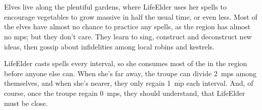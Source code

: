 \section{}
\label{plateauGardens}

Elves live along the plentiful gardens, where \gls{LifeElder} uses her spells to encourage vegetables to grow massive in half the usual time, or even less.
Most of the elves have almost no chance to practice any spells, as the \gls{region} has almost no \glspl{mp}; but they don't care.
They learn to sing, construct and deconstruct new ideas, then gossip about infidelities among local robins and kestrels.

\Gls{LifeElder} casts spells every \gls{interval}, so she consumes most of the  in the \gls{region} before anyone else can.
When she's far away, the troupe can divide 2~\glspl{mp} among themselves, and when she's nearer, they only regain 1~\gls{mp} each \gls{interval}.
And, of course, once the troupe regain 0~\glspl{mp}, they should understand, that \gls{LifeElder} must be close.


